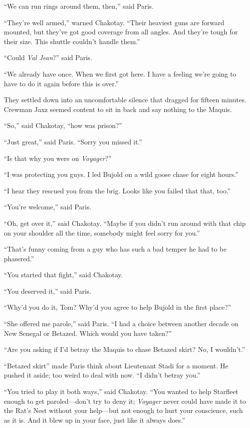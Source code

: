 \documentclass[twoside,letterpaper,12pt]{memoir}
\begin{document}
``We can run rings around them, then,'' said Paris.

``They're well armed,'' warned Chakotay. ``Their heaviest guns are forward mounted, but they've got good coverage from all angles. And they're tough for their size. This shuttle couldn't handle them.''

``Could \textit{Val Jean}?'' said Paris.

``We already have once. When we first got here. I have a feeling we're going to have to do it again before this is over.''

They settled down into an uncomfortable silence that dragged for fifteen minutes. Crewman Jaxz seemed content to sit in back and say nothing to the Maquis.

``So,'' said Chakotay, ``how was prison?''

``Just great,'' said Paris. ``Sorry you missed it.''

``Is that why you were on \textit{Voyager}?''

``I was protecting you guys. I led Bujold on a wild goose chase for eight hours.''

``I hear they rescued you from the brig. Looks like you failed that that, too.''

``You're welcome,'' said Paris.

``Oh, get over it,'' said Chakotay. ``Maybe if you didn't run around with that chip on your shoulder all the time, somebody might feel sorry for you.''

``That's funny coming from a guy who has such a bad temper he had to be phasered.''

``You started that fight,'' said Chakotay.

``You deserved it,'' said Paris.

``Why'd you do it, Tom? Why'd you agree to help Bujold in the first place?''

``She offered me parole,'' said Paris. ``I had a choice between another decade on New Senegal or Betazed. Which would you have taken?''

``Are you asking if I'd betray the Maquis to chase Betazed skirt? No, I wouldn't.''

``Betazed skirt'' made Paris think about Lieutenant Stadi for a moment. He pushed it aside; too weird to deal with now. ``I didn't betray you.''

``You tried to play it both ways,'' said Chakotay. ``You wanted to help Starfleet enough to get paroled---don't try to deny it; \textit{Voyager} never could have made it to the Rat's Nest without your help---but not enough to hurt your conscience, such as it is. And it blew up in your face, just like it always does.''
\end{document}
